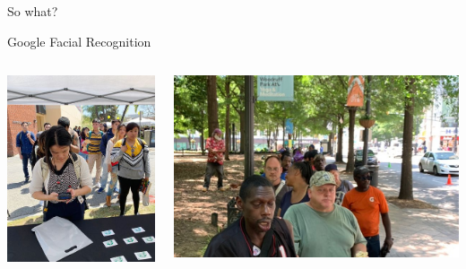 \documentclass[main]{subfiles}
\begin{document}
\begin{frame}[standout]
    
So what?

\end{frame}

\begin{frame}{Google Facial Recognition}

\begin{columns}
\begin{column}{0.3\textwidth}
    \includegraphics[width=\textwidth]{figures/google_fr/college_campuses.jpeg}
\end{column}
\begin{column}{0.3\textwidth}
    \includegraphics[width=\textwidth]{figures/google_fr/atlanta_homeless.jpeg}

\end{column}
\end{columns}
\end{frame}
\end{document}
